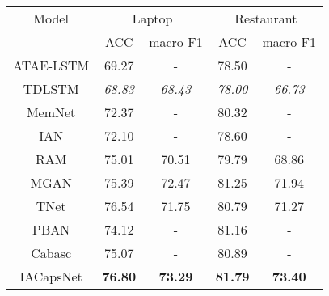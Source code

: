 \begin{tabular}{|c|c|c|c|c }
    Model & \multicolumn{2}{c|}{Laptop} & \multicolumn{2}{c|}{Restaurant} \\
     & ACC & macro F1 & ACC & macro F1 \\
    ATAE-LSTM \citep{wang-etal-2016-attention} & 69.27 & - & 78.50 & - \\
    TDLSTM \citep{tang-etal-2016-effective} & \textit{68.83} & \textit{68.43} & \textit{78.00} & \textit{66.73} \\
    MemNet \citep{tang-etal-2016-aspect} & 72.37 & - & 80.32 & - \\
    IAN \citep{ma2017interactive} & 72.10 & - & 78.60 & - \\
    RAM \citep{chen-etal-2017-recurrent} & 75.01 & 70.51 & 79.79 & 68.86 \\
    MGAN \citep{fan-etal-2018-multi} & 75.39 & 72.47 & 81.25 & 71.94 \\
    TNet \citep{li-etal-2018-transformation} & 76.54 & 71.75 & 80.79 & 71.27 \\
    PBAN \citep{gu-etal-2018-position} & 74.12 & - & 81.16 & - \\
    Cabasc \citep{liu2018content} & 75.07 & - & 80.89 & - \\
    IACapsNet \citep{du-etal-2019-capsule} & \textbf{76.80} & \textbf{73.29} & \textbf{81.79} & \textbf{73.40} \\
\end{tabular}